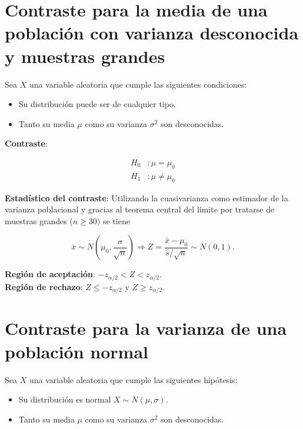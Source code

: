 \documentclass[
  a4paper,
]{scrreport}
\providecommand{\tightlist}{%
  \setlength{\itemsep}{0pt}\setlength{\parskip}{0pt}}\usepackage{longtable,booktabs,array}
\theoremstyle{definition}
\theoremstyle{definition}
\theoremstyle{plain}
\theoremstyle{remark}
\begin{document}
\hypertarget{contraste-para-la-media-de-una-poblaciuxf3n-con-varianza-desconocida-y-muestras-grandes}{%
\section{Contraste para la media de una población con varianza
desconocida y muestras
grandes}\label{contraste-para-la-media-de-una-poblaciuxf3n-con-varianza-desconocida-y-muestras-grandes}}

Sea \(X\) una variable aleatoria que cumple las siguientes condiciones:

\begin{itemize}
\tightlist
\item
  Su distribución puede ser de cualquier tipo.
\item
  Tanto su media \(\mu\) como su varianza \(\sigma^2\) son desconocidas.
\end{itemize}

\textbf{Contraste}:

\[
\begin{aligned}
H_0 &: \mu=\mu_0 \\
H_1 &: \mu\neq \mu_0
\end{aligned}
\]

\textbf{Estadístico del contraste}: Utilizando la cuasivarianza como
estimador de la varianza poblacional y gracias al teorema central del
límite por tratarse de muestras grandes (\(n\geq 30)\) se tiene

\[
\bar x\sim N\left(\mu_0,\frac{\sigma}{\sqrt{n}}\right) \Rightarrow Z=\frac{\bar x-\mu_0}{\hat s/\sqrt{n}}\sim N(0,1).
\]

\textbf{Región de aceptación}: \(-z_{\alpha/2}< Z < z_{\alpha/2}\).\\
\textbf{Región de rechazo}: \(Z\leq -z_{\alpha/2}\) y
\(Z\geq z_{\alpha/2}\).

\hypertarget{contraste-para-la-varianza-de-una-poblaciuxf3n-normal}{%
\section{Contraste para la varianza de una población
normal}\label{contraste-para-la-varianza-de-una-poblaciuxf3n-normal}}

Sea \(X\) una variable aleatoria que cumple las siguientes hipótesis:

\begin{itemize}
\tightlist
\item
  Su distribución es normal \(X\sim N(\mu,\sigma)\).
\item
  Tanto su media \(\mu\) como su varianza \(\sigma^2\) son desconocidas.
\end{itemize}
\end{document}
